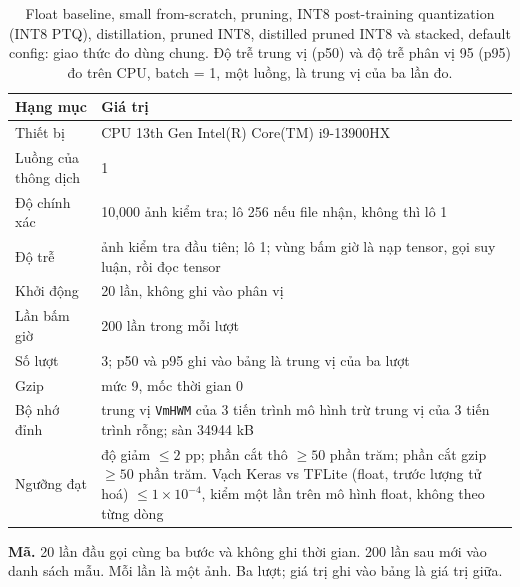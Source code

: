 \documentclass[13pt,a4paper]{article}
\begin{document}
\begin{table}[H]
\centering
\caption{Float baseline, small from-scratch, pruning, INT8 post-training quantization (INT8 PTQ), distillation, pruned INT8, distilled pruned INT8 và stacked, default config: giao thức đo dùng chung. Độ trễ trung vị (p50) và độ trễ phân vị 95 (p95) đo trên CPU, batch = 1, một luồng, là trung vị của ba lần đo.}
\label{tab:protocol}
\begin{tabularx}{\textwidth}{|l|Y|}
\hline
Hạng mục & Giá trị \\ \hline
Thiết bị & CPU 13th Gen Intel(R) Core(TM) i9-13900HX \\ \hline
Luồng của thông dịch & 1 \\ \hline
Độ chính xác & 10{,}000 ảnh kiểm tra; lô 256 nếu file nhận, không thì lô 1 \\ \hline
Độ trễ & ảnh kiểm tra đầu tiên; lô 1; vùng bấm giờ là nạp tensor, gọi suy luận, rồi đọc tensor \\ \hline
Khởi động & 20 lần, không ghi vào phân vị \\ \hline
Lần bấm giờ & 200 lần trong mỗi lượt \\ \hline
Số lượt & 3; p50 và p95 ghi vào bảng là trung vị của ba lượt \\ \hline
Gzip & mức 9, mốc thời gian 0 \\ \hline
Bộ nhớ đỉnh & trung vị \texttt{VmHWM} của 3 tiến trình mô hình trừ trung vị của 3 tiến trình rỗng; sàn 34944 kB \\ \hline
Ngưỡng đạt & độ giảm \(\le 2\) pp; phần cắt thô \(\ge 50\) phần trăm; phần cắt gzip \(\ge 50\) phần trăm. Vạch Keras vs TFLite (float, trước lượng tử hoá) \(\le 1\times 10^{-4}\), kiểm một lần trên mô hình float, không theo từng dòng \\ \hline
\end{tabularx}
\end{table}

\filbreak
\noindent\textbf{Mã.}
20 lần đầu gọi cùng ba bước và không ghi thời gian.
200 lần sau mới vào danh sách mẫu.
Mỗi lần là một ảnh.
Ba lượt; giá trị ghi vào bảng là giá trị giữa.
\end{document}
